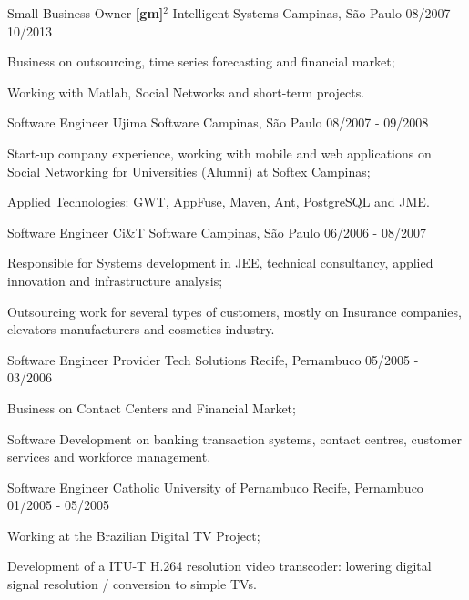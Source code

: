 \begin{cventries}

\cventry
{Small Business Owner}
{\textbf{[gm]}$^2$ Intelligent Systems}
{Campinas, São Paulo}
{08/2007 - 10/2013}
{
\begin{cvitems}
\item Business on outsourcing, time series forecasting and financial market;
\item Working with Matlab, Social Networks and short-term projects.
\end{cvitems}
}

\cventry
{Software Engineer}
{Ujima Software}
{Campinas, São Paulo}
{08/2007 - 09/2008}
{
\begin{cvitems}
\item Start-up company experience, working with mobile and web applications on Social Networking for Universities (Alumni) at Softex Campinas;
\item Applied Technologies: GWT, AppFuse, Maven, Ant, PostgreSQL and JME.
\end{cvitems}
}

\cventry
{Software Engineer}
{Ci\&T Software}
{Campinas, São Paulo}
{06/2006 - 08/2007}
{
\begin{cvitems}
\item Responsible for Systems development in JEE, technical consultancy, applied innovation and infrastructure analysis;
\item Outsourcing work for several types of customers, mostly on Insurance companies, elevators manufacturers and cosmetics industry.
\end{cvitems}
}

\cventry
{Software Engineer}
{Provider Tech Solutions}
{Recife, Pernambuco}
{05/2005 - 03/2006}
{
\begin{cvitems}
\item Business on Contact Centers and Financial Market;
\item Software Development on banking transaction systems, contact centres, customer services and workforce management.
\end{cvitems}
}

\cventry
{Software Engineer}
{Catholic University of Pernambuco}
{Recife, Pernambuco}
{01/2005 - 05/2005}
{
\begin{cvitems}
\item Working at the Brazilian Digital TV Project;
\item Development of a ITU-T H.264 resolution video transcoder: lowering digital signal resolution / conversion to simple TVs.
\end{cvitems}
}


\end{cventries}
